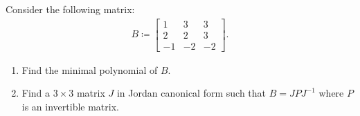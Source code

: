Consider the following matrix:
\begin{align*}
B \coloneqq
\begin{bmatrix}
1 & 3 & 3
\\
2 & 2 & 3
\\
-1 & -2 & -2
\end{bmatrix}
.\end{align*}

\begin{enumerate}
\def\labelenumi{\alph{enumi}.}
\item
  Find the minimal polynomial of \(B\).
\item
  Find a \(3\times 3\) matrix \(J\) in Jordan canonical form such that
  \(B = JPJ^{-1}\) where \(P\) is an invertible matrix.
\end{enumerate}


\printbibliography[title=Bibliography]



